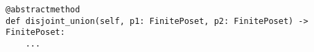 \par\begin{minipage}{74ex}
\begin{verbatim}
@abstractmethod
def disjoint_union(self, p1: FinitePoset, p2: FinitePoset) -> FinitePoset:
    ...
\end{verbatim}
\end{minipage}\par